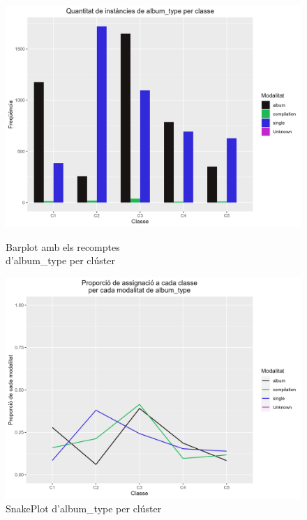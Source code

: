\documentclass{article}
\begin{document}
\begin{figure}[H]
\centering
    \begin{minipage}{.49\textwidth}
        \centering
        \includegraphics[width=0.95\linewidth]{Images/5_Profiling/categoriques/cat/Cat_BarPlot_album_type.png}
        \caption{Barplot amb els recomptes \\ d'album\_type per clúster}
        \label{fig:Cat_BarPlot_album_type}
    \end{minipage}%
    \begin{minipage}{.49\textwidth}
        \centering
        \includegraphics[width=0.95\linewidth]{Images/5_Profiling/categoriques/cat/Cat_SnakePlot_album_type.png}
        \caption{SnakePlot d'album\_type per clúster}
        \label{fig:Cat_SnakePlot_album_type}
    \end{minipage}%
\end{figure}
\end{document}
